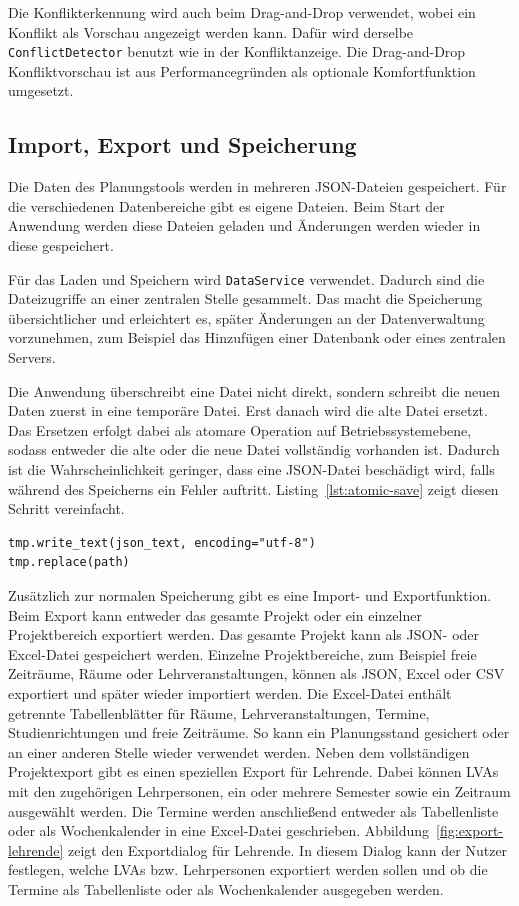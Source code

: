 \documentclass[12pt,a4paper]{article}
\begin{document}
Die Konflikterkennung wird auch beim Drag-and-Drop verwendet, wobei ein Konflikt als Vorschau angezeigt werden kann. Dafür wird derselbe \texttt{ConflictDetector} benutzt wie in der Konfliktanzeige. Die Drag-and-Drop Konfliktvorschau ist aus Performancegründen als optionale Komfortfunktion umgesetzt.

\subsection{Import, Export und Speicherung}

Die Daten des Planungstools werden in mehreren JSON-Dateien gespeichert. Für die verschiedenen Datenbereiche gibt es eigene Dateien. Beim Start der Anwendung werden diese Dateien geladen und Änderungen werden wieder in diese gespeichert.

Für das Laden und Speichern wird \texttt{DataService} verwendet. Dadurch sind die Dateizugriffe an einer zentralen Stelle gesammelt. Das macht die Speicherung übersichtlicher und erleichtert es, später Änderungen an der Datenverwaltung vorzunehmen, zum Beispiel das Hinzufügen einer Datenbank oder eines zentralen Servers.

Die Anwendung überschreibt eine Datei nicht direkt, sondern schreibt die neuen Daten zuerst in eine temporäre Datei. Erst danach wird die alte Datei ersetzt. Das Ersetzen erfolgt dabei als atomare Operation auf Betriebssystemebene, sodass entweder die alte oder die neue Datei vollständig vorhanden ist. Dadurch ist die Wahrscheinlichkeit geringer, dass eine JSON-Datei beschädigt wird, falls während des Speicherns ein Fehler auftritt. Listing~\ref{lst:atomic-save} zeigt diesen Schritt vereinfacht.

\begin{lstlisting}[caption={Atomare Speicherung über eine temporäre Datei}, label={lst:atomic-save}]
tmp.write_text(json_text, encoding="utf-8")
tmp.replace(path)
\end{lstlisting}

Zusätzlich zur normalen Speicherung gibt es eine Import- und Exportfunktion. Beim Export kann entweder das gesamte Projekt oder ein einzelner Projektbereich exportiert werden. Das gesamte Projekt kann als JSON- oder Excel-Datei gespeichert werden.
Einzelne Projektbereiche, zum Beispiel freie Zeiträume, Räume oder Lehrveranstaltungen, können als JSON, Excel oder CSV exportiert und später wieder importiert werden.
Die Excel-Datei enthält getrennte Tabellenblätter für Räume, Lehrveranstaltungen, Termine, Studienrichtungen und freie Zeiträume. So kann ein Planungsstand gesichert oder an einer anderen Stelle wieder verwendet werden.
Neben dem vollständigen Projektexport gibt es einen speziellen Export für Lehrende. Dabei können LVAs mit den zugehörigen Lehrpersonen, ein oder mehrere Semester sowie ein Zeitraum ausgewählt werden.
Die Termine werden anschließend entweder als Tabellenliste oder als Wochenkalender in eine Excel-Datei geschrieben.
Abbildung~\ref{fig:export-lehrende} zeigt den Exportdialog für Lehrende. In diesem Dialog kann der Nutzer festlegen, welche LVAs bzw. Lehrpersonen exportiert werden sollen und ob die Termine als Tabellenliste oder als Wochenkalender ausgegeben werden.
\end{document}
